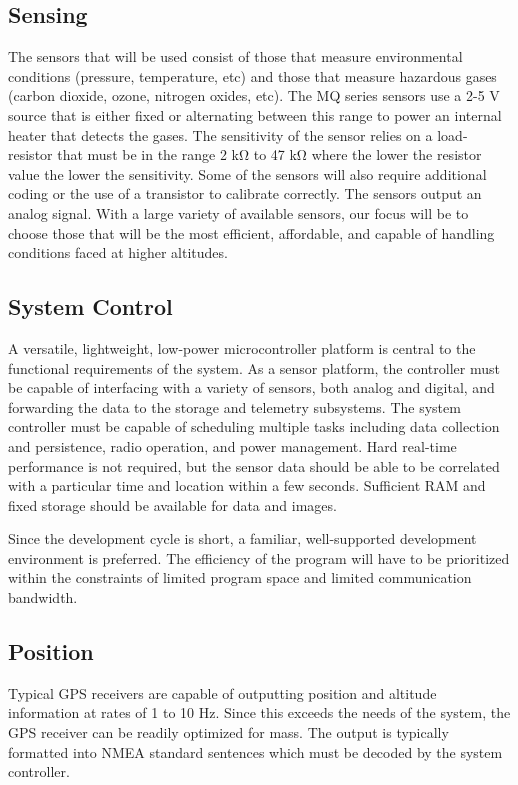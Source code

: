 \documentclass[conference,compsoc]{IEEEtran}
\begin{document}
\subsection{Sensing}
The sensors that will be used consist of those that measure environmental conditions (pressure, temperature, etc) and those that measure hazardous gases (carbon dioxide, ozone, nitrogen oxides, etc). The MQ series sensors use a 2-5 V source that is either fixed or alternating between this range to power an internal heater that detects the gases. The sensitivity of the sensor relies on a load-resistor that must be in the range 2 kΩ to 47 kΩ where the lower the resistor value the lower the sensitivity. Some of the sensors will also require additional coding or the use of a transistor to calibrate correctly. The sensors output an analog signal. With a large variety of available sensors, our focus will be to choose those that will be the most efficient, affordable, and capable of handling conditions faced at higher altitudes. 

\subsection{System Control}
A versatile, lightweight, low-power microcontroller platform is central to the functional requirements of the system.  As a sensor platform, the controller must be capable of interfacing with a variety of sensors, both analog and digital, and forwarding the data to the storage and telemetry subsystems. The system controller must be capable of scheduling multiple tasks including data collection and persistence, radio operation, and power management.  Hard real-time performance is not required, but the sensor data should be able to be correlated with a particular time and location within a few seconds.  Sufficient RAM and fixed storage should be available for data and images.

Since the development cycle is short, a familiar, well-supported development environment is preferred.  The efficiency of the program will have to be prioritized within the constraints of limited program space and limited communication bandwidth.

\subsection{Position}
Typical GPS receivers are capable of outputting position and altitude information at rates of 1 to 10 Hz.  Since this exceeds the needs of the system, the GPS receiver can be readily optimized for mass.  The output is typically formatted into NMEA standard sentences which must be decoded by the system controller.
\end{document}
